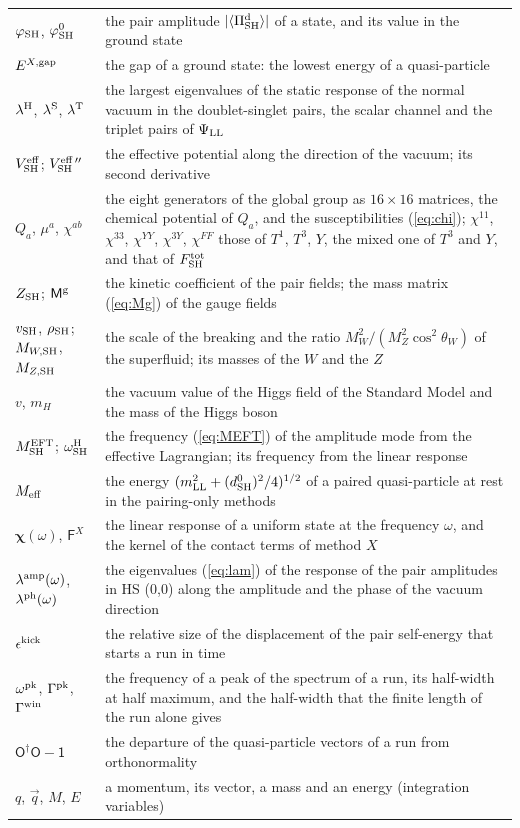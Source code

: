 \documentclass[aps,prd,onecolumn,superscriptaddress,nofootinbib,floatfix,longbibliography]{revtex4-2}
\newcommand{\LL}{{\rm LL}}
\newcommand{\SH}{{\rm SH}}
\begin{document}
\begin{longtable}{p{}p{}}
$\varphi_\SH$, $\varphi^0_\SH$ & the pair amplitude $|\langle\Pi^{\rm d}_\SH\rangle|$ of a state, and its value in the ground state \\
$E^{X,{\rm gap}}$ & the gap of a ground state: the lowest energy of a quasi-particle \\
$\lambda^{\rm H}$, $\lambda^{\rm S}$, $\lambda^{\rm T}$ & the largest eigenvalues of the static response of the normal vacuum in the doublet-singlet pairs, the scalar channel and the triplet pairs of $\Psi_\LL$ \\
$V^{\rm eff}_\SH$; $V^{\rm eff\,\prime\prime}_\SH$ & the effective potential along the direction of the vacuum; its second derivative \\
$Q_a$, $\mu^a$, $\chi^{ab}$ & the eight generators of the global group as $16\times16$ matrices, the chemical potential of $Q_a$, and the susceptibilities (\ref{eq:chi}); $\chi^{11}$, $\chi^{33}$, $\chi^{YY}$, $\chi^{3Y}$, $\chi^{FF}$ those of $T^1$, $T^3$, $Y$, the mixed one of $T^3$ and $Y$, and that of $F^{\rm tot}_\SH$ \\
$Z_\SH$; $\mathsf M^{\rm g}$ & the kinetic coefficient of the pair fields; the mass matrix (\ref{eq:Mg}) of the gauge fields \\
$v_\SH$, $\rho_\SH$; $M_{W,\SH}$, $M_{Z,\SH}$ & the scale of the breaking and the ratio $M_W^2/(M_Z^2\cos^2\theta_W)$ of the superfluid; its masses of the $W$ and the $Z$ \\
$v$, $m_H$ & the vacuum value of the Higgs field of the Standard Model and the mass of the Higgs boson \\
$M^{\rm EFT}_\SH$; $\omega^{\rm H}_\SH$ & the frequency (\ref{eq:MEFT}) of the amplitude mode from the effective Lagrangian; its frequency from the linear response \\
$M_{\rm eff}$ & the energy $(m_\LL^2+(d^0_\SH)^2/4)^{1/2}$ of a paired quasi-particle at rest in the pairing-only methods \\
$\bm\chi(\omega)$, $\mathsf F^X$ & the linear response of a uniform state at the frequency $\omega$, and the kernel of the contact terms of method $X$ \\
$\lambda^{\rm amp}(\omega)$, $\lambda^{\rm ph}(\omega)$ & the eigenvalues (\ref{eq:lam}) of the response of the pair amplitudes in HS (0,0) along the amplitude and the phase of the vacuum direction \\
$\epsilon^{\rm kick}$ & the relative size of the displacement of the pair self-energy that starts a run in time \\
$\omega^{\rm pk}$, $\Gamma^{\rm pk}$, $\Gamma^{\rm win}$ & the frequency of a peak of the spectrum of a run, its half-width at half maximum, and the half-width that the finite length of the run alone gives \\
$\mathsf O^\dagger\mathsf O-\mathsf 1$ & the departure of the quasi-particle vectors of a run from orthonormality \\
$q$, $\vec q$, $M$, $E$ & a momentum, its vector, a mass and an energy (integration variables) \\
\end{longtable}
\endgroup
\end{document}
